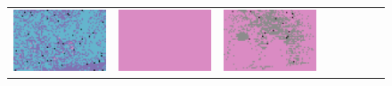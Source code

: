 \documentclass{ipol}
\begin{document}
\begin{figure}[ht]
\begin{tabular}{cccccccc}
                \includegraphics[width=\s]{images/bike/DHT/bid_64_grids.png} &
                \includegraphics[width=\s]{images/bike/LINEAR/bid_64_grids.png} &
                \includegraphics[width=\s]{images/bike/PPG/bid_64_grids.png} &

\end{tabular}
\end{figure}
\end{document}
